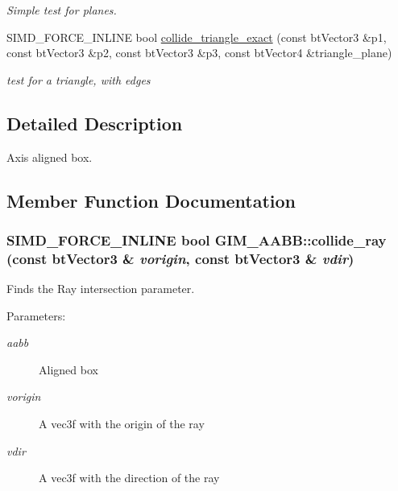 \begin{CompactItemize}
\begin{CompactList}\small\item\em Simple test for planes. \item\end{CompactList}\item 
\hypertarget{class_g_i_m___a_a_b_b_4a1ffa196d3981313fccf9e01aa383f9}{
SIMD\_\-FORCE\_\-INLINE bool \hyperlink{class_g_i_m___a_a_b_b_4a1ffa196d3981313fccf9e01aa383f9}{collide\_\-triangle\_\-exact} (const btVector3 \&p1, const btVector3 \&p2, const btVector3 \&p3, const btVector4 \&triangle\_\-plane)}
\label{class_g_i_m___a_a_b_b_4a1ffa196d3981313fccf9e01aa383f9}

\begin{CompactList}\small\item\em test for a triangle, with edges \item\end{CompactList}\end{CompactItemize}


\subsection{Detailed Description}
Axis aligned box. 

\subsection{Member Function Documentation}
\hypertarget{class_g_i_m___a_a_b_b_1fafc37703d288fd0fe862b861829287}{
\subsubsection[collide\_\-ray]{\setlength{\rightskip}{0pt plus 5cm}SIMD\_\-FORCE\_\-INLINE bool GIM\_\-AABB::collide\_\-ray (const btVector3 \& {\em vorigin}, \/  const btVector3 \& {\em vdir})}}
\label{class_g_i_m___a_a_b_b_1fafc37703d288fd0fe862b861829287}


Finds the Ray intersection parameter. 

\begin{Desc}
\item[Parameters:]
\begin{description}
\item[{\em aabb}]Aligned box \item[{\em vorigin}]A vec3f with the origin of the ray \item[{\em vdir}]A vec3f with the direction of the ray \end{description}
\end{Desc}


